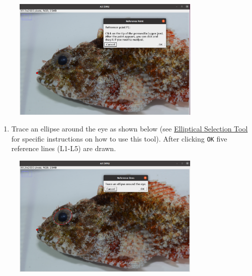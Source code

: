 \documentclass[
  letterpaper,
]{scrbook}
\providecommand{\tightlist}{%
  \setlength{\itemsep}{0pt}\setlength{\parskip}{0pt}}\usepackage{longtable,booktabs,array}
\begin{document}
\begin{figure}

{\centering \includegraphics[width=0.8\textwidth,height=\textheight]{./images/screenshots/tip_upper_jaw_head.png}

}

\end{figure}

\begin{enumerate}
\def\labelenumi{\arabic{enumi}.}
\setcounter{enumi}{3}
\tightlist
\item
  Trace an ellipse around the eye as shown below (see
  \href{https://imagej.nih.gov/ij/docs/guide/146-19.html}{Elliptical
  Selection Tool} for specific instructions on how to use this tool).
  After clicking \texttt{OK} five reference lines (L1-L5) are drawn.
\end{enumerate}

\begin{figure}

{\centering \includegraphics[width=0.8\textwidth,height=\textheight]{./images/screenshots/eye_ellipse_head.png}

}

\end{figure}
\end{document}
